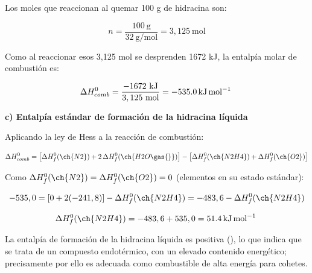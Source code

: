 \begin{exerciseEVAU}
\begin{solu}
        Los moles que reaccionan al quemar 100 g de hidracina son:

        \begin{equation*}
            n = \dfrac{100 \ \si{\gram}}{32 \ \si{\gram\per\mole}} = 3,125 \ \text{mol}
        \end{equation*}

        Como al reaccionar esos 3,125 mol se desprenden 1672 kJ, la entalpía molar de combustión es:

        \begin{equation*}
            \Delta H^0_{comb} = \dfrac{-1672 \ \si{\kilo\joule}}{3,125 \ \text{mol}} = \energia[kjmol]{-535.0}
        \end{equation*}

        \textbf{c) Entalpía estándar de formación de la hidracina líquida}

        Aplicando la ley de Hess a la reacción de combustión:

        \begin{equation*}
            \Delta H^0_{comb} = \left[ \Delta H^0_f (\ch{N2}) + 2\, \Delta H^0_f (\ch{H2O \gas{}}) \right] - \left[ \Delta H^0_f (\ch{N2H4}) + \Delta H^0_f (\ch{O2}) \right]
        \end{equation*}

        Como \(\Delta H^0_f (\ch{N2}) = \Delta H^0_f (\ch{O2}) = 0\) (elementos en su estado estándar):

        \begin{equation*}
            -535,0 = \left[ 0 + 2(-241,8) \right] - \Delta H^0_f (\ch{N2H4}) = -483,6 - \Delta H^0_f (\ch{N2H4})
        \end{equation*}

        \begin{equation*}
            \Delta H^0_f (\ch{N2H4}) = -483,6 + 535,0 = \energia[kjmol]{51.4}
        \end{equation*}

        La entalpía de formación de la hidracina líquida es positiva (), lo que indica que se trata de un compuesto endotérmico, con un elevado contenido energético; precisamente por ello es adecuada como combustible de alta energía para cohetes.

    \end{solu}
\end{exerciseEVAU}


